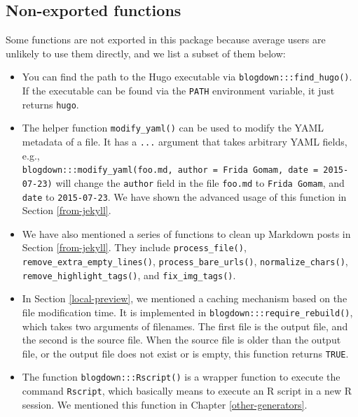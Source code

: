 \documentclass[12pt,]{krantz}
\theoremstyle{definition}
\theoremstyle{definition}
\theoremstyle{definition}
\theoremstyle{remark}
\begin{document}
\subsection{Non-exported functions}\label{non-exported-functions}

Some functions are not exported in this package because average users
are unlikely to use them directly, and we list a subset of them below:

\begin{itemize}
\item
  You can find the path to the Hugo executable via
  \texttt{blogdown:::find\_hugo()}. If the executable can be found via
  the \texttt{PATH} environment variable, it just returns
  \texttt{\textquotesingle{}hugo\textquotesingle{}}.
\item
  The helper function \texttt{modify\_yaml()} can be used to modify the
  YAML metadata of a file. It has a \texttt{...} argument that takes
  arbitrary YAML fields, e.g.,
  \texttt{blogdown:::modify\_yaml(\textquotesingle{}foo.md\textquotesingle{},\ author\ =\ \textquotesingle{}Frida\ Gomam\textquotesingle{},\ date\ =\ \textquotesingle{}2015-07-23\textquotesingle{})}
  will change the \texttt{author} field in the file \texttt{foo.md} to
  \texttt{Frida\ Gomam}, and \texttt{date} to \texttt{2015-07-23}. We
  have shown the advanced usage of this function in Section
  \ref{from-jekyll}.
\item
  We have also mentioned a series of functions to clean up Markdown
  posts in Section \ref{from-jekyll}. They include
  \texttt{process\_file()}, \texttt{remove\_extra\_empty\_lines()},
  \texttt{process\_bare\_urls()}, \texttt{normalize\_chars()},
  \texttt{remove\_highlight\_tags()}, and \texttt{fix\_img\_tags()}.
\item
  In Section \ref{local-preview}, we mentioned a caching mechanism based
  on the file modification time. It is implemented in
  \texttt{blogdown:::require\_rebuild()}, which takes two arguments of
  filenames. The first file is the output file, and the second is the
  source file. When the source file is older than the output file, or
  the output file does not exist or is empty, this function returns
  \texttt{TRUE}.
\item
  The function \texttt{blogdown:::Rscript()} is a wrapper function to
  execute the command \texttt{Rscript}, which basically means to execute
  an R script in a new R session. We mentioned this function in Chapter
  \ref{other-generators}.
\end{itemize}
\end{document}
